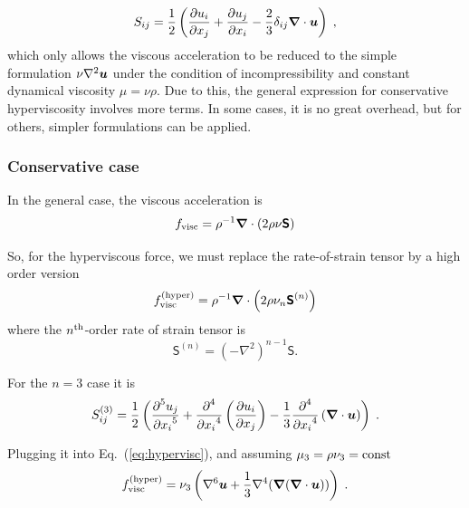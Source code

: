\documentclass[\mydriver,12pt,twoside,notitlepage,a4paper]{article}
\renewcommand{\vec}[1]{\mbox{\boldmath{$#1$}}}
\newcommand{\grad}    {\vec{\nabla}}
\newcommand{\Div}     {\vec{\nabla}\cdot}
\newcommand{\Laplace} {\nabla^2}
\newcommand{\pderiv}[2]{\frac{\partial #1}{\partial #2}}
\newcommand{\pderivn}[3]{\frac{{\partial{}}^{#3} #1}{{\partial #2}^{#3}}}
\newcommand{\uv}            {\vec{u}}
\newcommand{\Strain}        {\boldsymbol{\mathsf{S}}}
\begin{document}
\begin{equation}
  \label{eq:strain}
  S_{ij} = \frac{1}{2}
           \left(
             \pderiv{u_i}{x_j} + \pderiv{u_j}{x_i}
             - \frac{2}{3}\delta_{ij} \Div{\uv}
           \right) \; ,
\end{equation}
which only allows the viscous acceleration to be reduced to the simple
formulation $\nu\Laplace{\uv}$ under the condition of incompressibility
and constant dynamical viscosity $\mu=\nu\rho$.
Due to this, the general expression for conservative hyperviscosity
involves more terms.
In some cases, it is no great overhead, but for others, simpler
formulations can be applied.


\subsubsection{Conservative case}

In the general case, the viscous acceleration is
\begin{equation}
  f_{\rm visc} = \rho^{-1} \Div{\left(2\rho\nu\Strain\right)}
\end{equation}

So, for the hyperviscous force, we must replace the rate-of-strain tensor
by a high order version
\begin{equation}
  \label{eq:hypervisc}
  f_{\rm visc}^{({\rm hyper})} = \rho^{-1} \Div{\left(2\rho\nu_n\Strain^{(n)}\right)}
\end{equation}
where the $n^{\rm th}$-order rate of strain tensor is
\begin{equation}
  \Strain^{(n)} = (-\nabla^2)^{n-1}\Strain.
\end{equation}

For the $n=3$ case it is
\begin{equation}
  S^{(3)}_{ij} = \frac{1}{2}
                 \left(
                   \pderivn{u_j}{x_i}{5}
                   + \pderivn{}{x_i}{4}
                     \left( \pderiv{u_i}{x_j} \right)
                   - \frac{1}{3} \pderivn{}{x_i}{4}
                     \left(\Div{\uv}\right)
                 \right) \; .
\end{equation}

Plugging it into Eq.~(\ref{eq:hypervisc}), and assuming
$\mu_3=\rho\nu_3={\rm const}$
\begin{equation}
  \label{eq:hyper-mu-const}
  f_{\rm visc}^{({\rm hyper})}
    = \nu_3 \left(
              \nabla^6\uv
              + \frac{1}{3}\nabla^4({\grad({\Div{\uv}})})
            \right) \; .
\end{equation}
\end{document}
